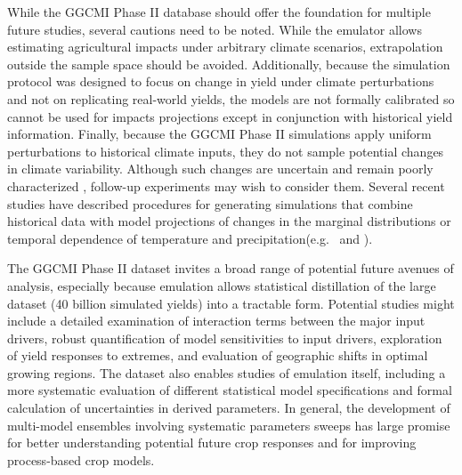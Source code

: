 \documentclass[esd, manuscript]{copernicus} %
\begin{document}
While the GGCMI Phase II database should offer the foundation for multiple future studies, several cautions need to be noted. While the emulator allows estimating agricultural impacts under arbitrary climate scenarios, extrapolation outside the sample space should be avoided. Additionally, because the simulation protocol was designed to focus on change in yield under climate perturbations and not on replicating real-world yields, the models are not formally calibrated so cannot be used for impacts projections except in conjunction with historical yield information. Finally, because the GGCMI Phase II simulations apply uniform perturbations to historical climate inputs, they do not sample potential changes in climate variability. Although such changes are uncertain and remain poorly characterized \citep[e.g.][]{Alexande2006, Kodra2014}, follow-up experiments may wish to consider them. Several recent studies have described procedures for generating simulations that combine historical data with model projections of changes in the marginal distributions or temporal dependence of temperature and precipitation(e.g.\ \citet{Leeds2015, poppick2016, Won16} and \citet{Haugen2018}).

The GGCMI Phase II dataset invites a broad range of potential future avenues of analysis, especially because emulation allows statistical distillation of the large dataset (40 billion simulated yields) into a tractable form. Potential studies might include a detailed examination of interaction terms between the major input drivers, robust quantification of model sensitivities to input drivers, exploration of yield responses to extremes, and evaluation of geographic shifts in optimal growing regions. The dataset also enables studies of emulation itself, including a more systematic evaluation of different statistical model specifications and formal calculation of uncertainties in derived parameters. In general, the development of multi-model ensembles involving systematic parameters sweeps has large promise for better understanding potential future crop responses and for improving process-based crop models.


\appendix
\section{}
\end{document}
